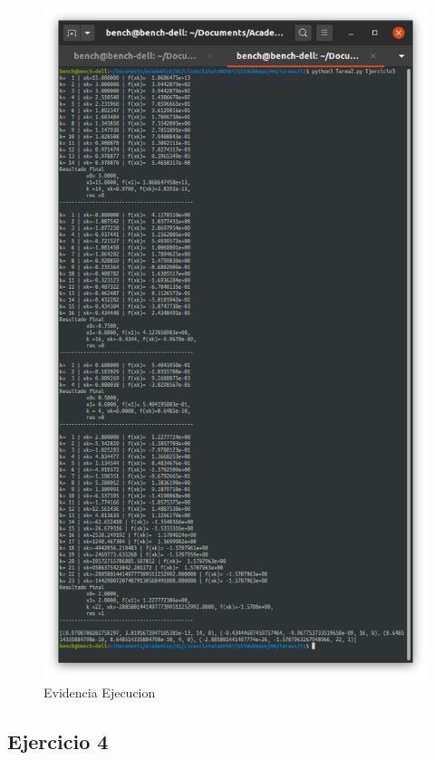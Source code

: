 \documentclass[11pt]{article}
\begin{document}
	\begin{figure}
		\centering
		\includegraphics{assets/E3-1.png}
		\caption{Evidencia Ejecucion}
	\end{figure}
















\newpage
    \hypertarget{ejercicio-4}{%
\subsection{Ejercicio 4}\label{ejercicio-4}}
\end{document}
